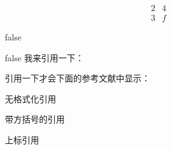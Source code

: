 \documentclass[12pt]{article} %
\begin{document}
	\[
	\begin{array}{r|r}
	2 & 4\\
	\hline
	3 & f
	\end{array}
	\]
	
	
	\if false 
	\begin{thebibliography}{99}
		
	\end{thebibliography}
	\fi 
	
	\if false
	我来引用一下：\cite{Jr2006A,银温泉2001我国地方市场分割的成因和治理}
	
	引用一下才会下面的参考文献中显示：
	
	
	
	\fi
	
	无格式化引用 \cite{aa}

	带方括号的引用 \parencite{aa}
	
	上标引用 \supercite{aa}
	
	\printbibliography[title={参考文献}]
	
\end{document}
